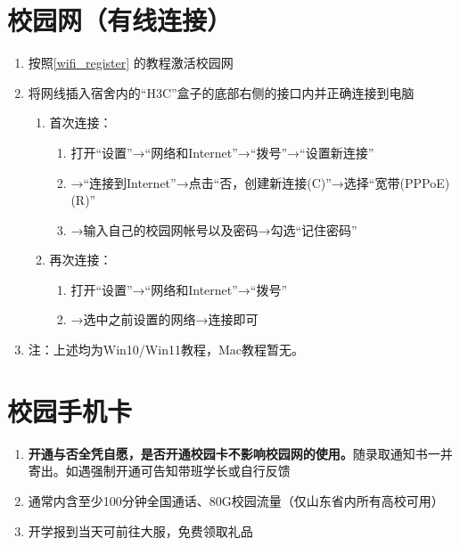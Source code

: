 \section[校园网（有线连接）]{校园网（有线连接）}
\begin{enumerate}
      \item 按照\uline{\ref{wifi_register}} 的教程激活校园网
      \item 将网线插入宿舍内的“H3C”盒子的底部右侧的接口内并正确连接到电脑\footnotemark
            \begin{enumerate}
                  \item 首次连接：
                        \begin{enumerate}
                              \item 打开“设置”→“网络和Internet”→“拨号”→“设置新连接”
                              \item →“连接到Internet”→点击“否，创建新连接(C)”→选择“宽带(PPPoE)(R)”
                              \item →输入自己的校园网帐号以及密码→勾选“记住密码”
                        \end{enumerate}
                  \item 再次连接：
                        \begin{enumerate}
                              \item 打开“设置”→“网络和Internet”→“拨号”
                              \item →选中之前设置的网络→连接即可
                        \end{enumerate}
            \end{enumerate}
      \item  注：上述均为Win10/Win11教程，Mac教程暂无。
\end{enumerate}

\section[校园手机卡]{校园手机卡}
\begin{enumerate}
      \item \textbf{开通与否全凭自愿，是否开通校园卡不影响校园网的使用。}随录取通知书一并寄出。如遇强制开通可告知带班学长或自行反馈
      \item 通常内含至少100分钟全国通话、80G校园流量（仅山东省内所有高校可用）\footnotemark
      \item 开学报到当天可前往大服，免费领取礼品
\end{enumerate}

